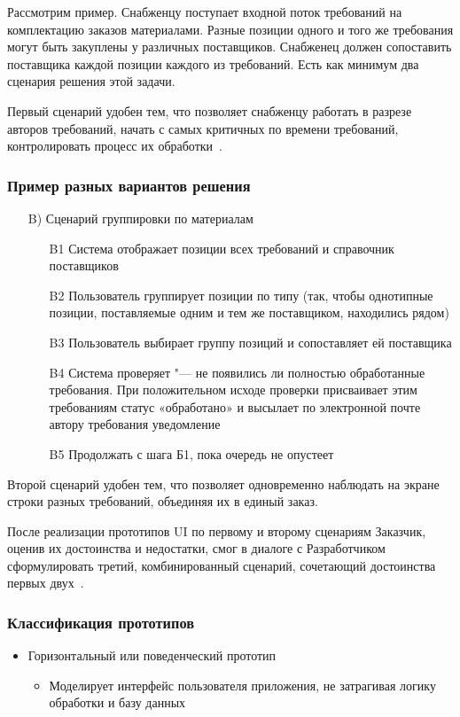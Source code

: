 \documentclass{../industrial-development}
\begin{document}
{\lecturenotes

Рассмотрим пример. Снабженцу поступает входной поток требований на комплектацию заказов материалами. Разные позиции одного и того же требования могут быть закуплены у различных поставщиков. Снабженец должен сопоставить поставщика каждой позиции каждого из требований. Есть как минимум два сценария решения этой задачи.

Первый сценарий удобен тем, что позволяет снабженцу работать в разрезе авторов требований, начать с самых критичных по времени требований, контролировать процесс их обработки~\cite[с.~53]{Maglinec}.

\begin{frame} \frametitle {Пример разных вариантов решения}
\begin{itemize}
\item[B)] Сценарий группировки по материалам
\begin{itemize}
\item[B1] Система отображает позиции всех требований и справочник поставщиков
\item[B2] Пользователь группирует позиции по типу (так, чтобы однотипные позиции, поставляемые одним и тем же поставщиком, находились рядом)
\item[B3] Пользователь выбирает группу позиций и сопоставляет ей поставщика
\item[B4] Система проверяет "--- не появились ли полностью обработанные требования. При положительном исходе проверки присваивает этим требованиям статус «обработано» и высылает по электронной почте автору требования уведомление
\item[B5] Продолжать с шага Б1, пока очередь не опустеет
\end{itemize}
\end{itemize}
\end{frame}

\lecturenotes

Второй сценарий удобен тем, что позволяет одновременно наблюдать на экране строки разных требований, объединяя их в единый заказ.

После реализации прототипов UI по первому и второму сценариям Заказчик, оценив их достоинства и недостатки, смог в диалоге с Разработчиком сформулировать третий, комбинированный сценарий, сочетающий достоинства первых двух~\cite[с.~53]{Maglinec}.


\begin{frame} \frametitle {Классификация прототипов}
\begin{itemize}
\item \alert{Горизонтальный или поведенческий прототип} 
\begin{itemize}
 \item Моделирует интерфейс пользователя приложения, не затрагивая логику обработки и базу данных
\end{itemize}


\end{itemize}
\end{frame}}
\end{document}

